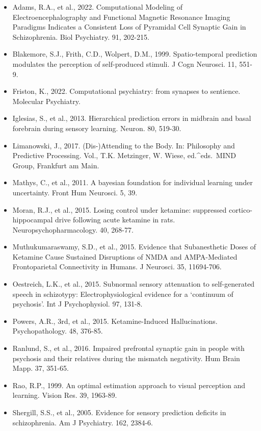 \documentclass[
]{article}
\providecommand{\tightlist}{%
  \setlength{\itemsep}{0pt}\setlength{\parskip}{0pt}}
\begin{document}
\begin{itemize}
\tightlist
\item
  Adams, R.A., et al., 2022. Computational Modeling of
  Electroencephalography and Functional Magnetic Resonance Imaging
  Paradigms Indicates a Consistent Loss of Pyramidal Cell Synaptic Gain
  in Schizophrenia. Biol Psychiatry. 91, 202-215.
\item
  Blakemore, S.J., Frith, C.D., Wolpert, D.M., 1999. Spatio-temporal
  prediction modulates the perception of self-produced stimuli. J Cogn
  Neurosci. 11, 551-9.
\item
  Friston, K., 2022. Computational psychiatry: from synapses to
  sentience. Molecular Psychiatry.
\item
  Iglesias, S., et al., 2013. Hierarchical prediction errors in midbrain
  and basal forebrain during sensory learning. Neuron. 80, 519-30.
\item
  Limanowski, J., 2017. (Dis-)Attending to the Body. In: Philosophy and
  Predictive Processing. Vol., T.K. Metzinger, W. Wiese,
  ed.\^{}eds.~MIND Group, Frankfurt am Main.
\item
  Mathys, C., et al., 2011. A bayesian foundation for individual
  learning under uncertainty. Front Hum Neurosci. 5, 39.
\item
  Moran, R.J., et al., 2015. Losing control under ketamine: suppressed
  cortico-hippocampal drive following acute ketamine in rats.
  Neuropsychopharmacology. 40, 268-77.
\item
  Muthukumaraswamy, S.D., et al., 2015. Evidence that Subanesthetic
  Doses of Ketamine Cause Sustained Disruptions of NMDA and
  AMPA-Mediated Frontoparietal Connectivity in Humans. J Neurosci. 35,
  11694-706.
\item
  Oestreich, L.K., et al., 2015. Subnormal sensory attenuation to
  self-generated speech in schizotypy: Electrophysiological evidence for
  a `continuum of psychosis'. Int J Psychophysiol. 97, 131-8.
\item
  Powers, A.R., 3rd, et al., 2015. Ketamine-Induced Hallucinations.
  Psychopathology. 48, 376-85.
\item
  Ranlund, S., et al., 2016. Impaired prefrontal synaptic gain in people
  with psychosis and their relatives during the mismatch negativity. Hum
  Brain Mapp. 37, 351-65.
\item
  Rao, R.P., 1999. An optimal estimation approach to visual perception
  and learning. Vision Res. 39, 1963-89.
\item
  Shergill, S.S., et al., 2005. Evidence for sensory prediction deficits
  in schizophrenia. Am J Psychiatry. 162, 2384-6.
\end{itemize}
\end{document}
